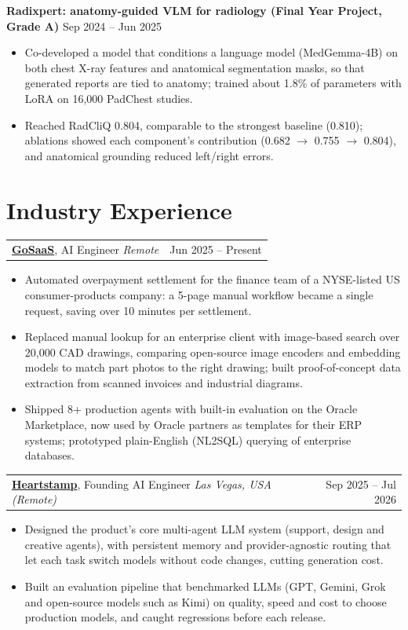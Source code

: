 \documentclass[10pt,letterpaper]{article}
\makeatletter
\newcommand{\role}[4]{%
  \par\vspace{4pt}\begin{tabularx}{\textwidth}{@{}X r@{}}
    \textbf{#1}, #2 \;\textbar\; \textit{#3} & #4 \\
  \end{tabularx}}
\makeatother
\begin{document}
\textbf{Radixpert: anatomy-guided VLM for radiology (Final Year Project, Grade A)} \hfill Sep 2024 -- Jun 2025
\begin{itemize}
  \item Co-developed a model that conditions a language model (MedGemma-4B) on both chest X-ray features and anatomical segmentation masks, so that generated reports are tied to anatomy; trained about 1.8\% of parameters with LoRA on 16,000 PadChest studies.
  \item Reached RadCliQ 0.804, comparable to the strongest baseline (0.810); ablations showed each component's contribution (0.682 $\rightarrow$ 0.755 $\rightarrow$ 0.804), and anatomical grounding reduced left/right errors.
\end{itemize}

\section{Industry Experience}
\vspace{-5pt}\role{\href{https://gosaas.ai/}{GoSaaS}}{AI Engineer}{Remote}{Jun 2025 -- Present}
\begin{itemize}
  \item Automated overpayment settlement for the finance team of a NYSE-listed US consumer-products company: a 5-page manual workflow became a single request, saving over 10 minutes per settlement.
  \item Replaced manual lookup for an enterprise client with image-based search over 20,000 CAD drawings, comparing open-source image encoders and embedding models to match part photos to the right drawing; built proof-of-concept data extraction from scanned invoices and industrial diagrams.
  \item Shipped 8+ production agents with built-in evaluation on the Oracle Marketplace, now used by Oracle partners as templates for their ERP systems; prototyped plain-English (NL2SQL) querying of enterprise databases.
\end{itemize}

\role{\href{https://heartstamp.com/}{Heartstamp}}{Founding AI Engineer}{Las Vegas, USA (Remote)}{Sep 2025 -- Jul 2026}
\begin{itemize}
  \item Designed the product's core multi-agent LLM system (support, design and creative agents), with persistent memory and provider-agnostic routing that let each task switch models without code changes, cutting generation cost.
  \item Built an evaluation pipeline that benchmarked LLMs (GPT, Gemini, Grok and open-source models such as Kimi) on quality, speed and cost to choose production models, and caught regressions before each release.
\end{itemize}
\end{document}
